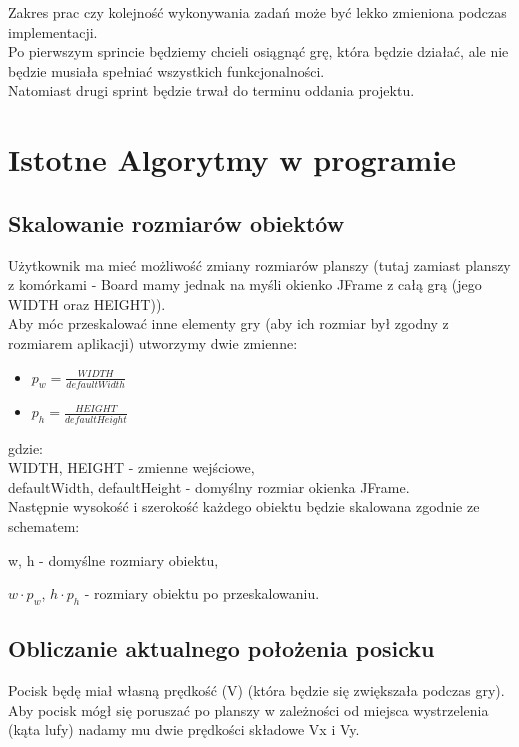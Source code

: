 \documentclass{article}
\begin{document}
Zakres prac czy kolejność wykonywania zadań może być lekko zmieniona podczas implementacji. \\
Po pierwszym sprincie będziemy chcieli osiągnąć grę, która będzie działać, ale nie będzie musiała spełniać wszystkich funkcjonalności. \\ Natomiast drugi sprint będzie trwał do terminu oddania projektu.

\clearpage

\section{Istotne Algorytmy w programie}

\subsection{Skalowanie rozmiarów obiektów}

Użytkownik ma mieć możliwość zmiany rozmiarów planszy (tutaj zamiast planszy z komórkami - Board mamy jednak na myśli okienko JFrame z całą grą (jego WIDTH oraz HEIGHT)). \\
Aby móc przeskalować inne elementy gry (aby ich rozmiar był zgodny z rozmiarem aplikacji) utworzymy dwie zmienne: \\

\begin{itemize}
    \item $p_w = \frac{WIDTH}{defaultWidth}$ 
    \item $p_h = \frac{HEIGHT}{defaultHeight}$
\end{itemize}
gdzie: \\
WIDTH, HEIGHT - zmienne wejściowe, \\
defaultWidth, defaultHeight - domyślny rozmiar okienka JFrame. \\

Następnie wysokość i szerokość każdego obiektu będzie skalowana zgodnie ze schematem:

w, h - domyślne rozmiary obiektu,

$ w \cdot p_w$, $h \cdot p_h $ - rozmiary obiektu po przeskalowaniu. 

\subsection {Obliczanie aktualnego położenia posicku}

Pocisk będę miał własną prędkość (V) (która będzie się zwiększała podczas gry).
Aby pocisk mógł się poruszać po planszy w zależności od miejsca wystrzelenia (kąta lufy) nadamy mu dwie prędkości składowe Vx i Vy.
\end{document}
